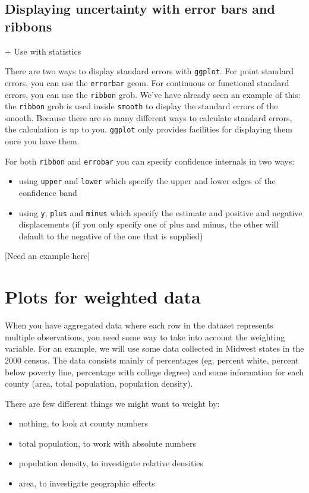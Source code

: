 \subsection{Displaying uncertainty with error bars and ribbons}\label{sub:error_bars}

+ Use with statistics

There are two ways to display standard errors with {\tt ggplot}.  For point standard errors, you can use the {\tt errorbar} geom.  For continuous or functional standard errors, you can use the {\tt ribbon} grob.  We've have already seen an example of this: the {\tt ribbon} grob is used inside {\tt smooth} to display the standard errors of the smooth.  Because there are so many different ways to calculate standard errors, the calculation is up to you.  {\tt ggplot} only provides facilities for displaying them once you have them.

For both {\tt ribbon} and {\tt errobar} you can specify confidence internals in two ways:

\begin{itemize}
	\item using {\tt upper} and {\tt lower} which specify the upper and lower edges of the confidence band

	\item using {\tt y}, {\tt plus} and {\tt minus} which specify the estimate and positive and negative displacements (if you only specify one of plus and minus, the other will default to the negative of the one that is supplied)
\end{itemize}

[Need an example here]

\section{Plots for weighted data}\label{sec:weighted_data}

When you have aggregated data where each row in the dataset represents multiple observations, you need some way to take into account the weighting variable.  For an example, we will use some data collected in Midwest states in the 2000 census.  The data consists mainly of percentages (eg. percent white, percent below poverty line, percentage with college degree) and some information for each county (area, total population, population density).

There are few different things we might want to weight by: 

\begin{itemize}
	\item nothing, to look at county numbers
	\item total population, to work with absolute numbers
	\item population density, to investigate relative densities
	\item area, to investigate geographic effects
\end{itemize}

